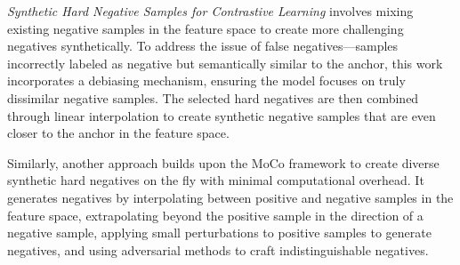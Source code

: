 \textit{Synthetic Hard Negative Samples for Contrastive Learning} \cite{dong2024synthetic} involves mixing existing negative samples in the feature space to create more challenging negatives synthetically. To address the issue of false negatives—samples incorrectly labeled as negative but semantically similar to the anchor, this work incorporates a debiasing mechanism, ensuring the model focuses on truly dissimilar negative samples. 
The selected hard negatives are then combined through linear interpolation to create synthetic negative samples that are even closer to the anchor in the feature space. 

Similarly, another approach \cite{giakoumoglou2024synco} builds upon the MoCo framework \cite{he2020momentum} to create diverse synthetic hard negatives on the fly with minimal computational overhead. It generates negatives by interpolating between positive and negative samples in the feature space, extrapolating beyond the positive sample in the direction of a negative sample, applying small perturbations to positive samples to generate negatives, and using adversarial methods to craft indistinguishable negatives.